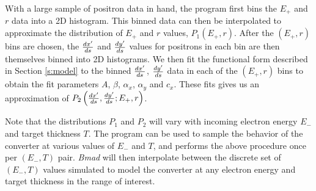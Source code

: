 \documentclass[12pt]{article}
\begin{document}
With a large sample of positron data in hand, the program first bins the $E_+$ and $r$ data into a 2D histogram.
This binned data can then be interpolated to approximate the distribution of $E_+$ and $r$ values, $P_1(E_+, r)$.
After the $(E_+, r)$ bins are chosen, the $\frac{dx'}{ds}$ and $\frac{dy'}{ds}$ values for positrons in each bin are then themselves binned into 2D histograms.
We then fit the functional form described in Section \ref{s:model} to the binned $\frac{dx'}{ds}$, $\frac{dy'}{ds}$ data in each of the $(E_+, r)$ bins to obtain the fit parameters $A$, $\beta$, $\alpha_x$, $\alpha_y$ and $c_x$.
These fits gives us an approximation of $P_2 \left( \frac{dx'}{ds}, \frac{dy'}{ds} ; E_+, r \right)$.

Note that the distributions $P_1$ and $P_2$ will vary with incoming electron energy $E_-$ and target thickness $T$.
The program can be used to sample the behavior of the converter at various values of $E_-$ and $T$, and performs the above procedure once per $(E_-, T)$ pair.
\textit{Bmad} will then interpolate between the discrete set of $(E_-, T)$ values simulated to model the converter at any electron energy and target thickness in the range of interest.



\printbibliography
\end{document}
